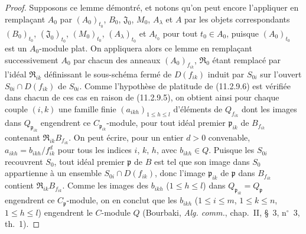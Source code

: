 \begin{proof}
Supposons ce lemme démontré, et notons qu'on peut encore l'appliquer en
remplaçant $A_0$ par $(A_0)_{t_0}$, $B_0$, $\mathfrak J_0$, $M_0$,
$A_\lambda$ et $A$ par les objets correspondants $(B_0)_{t_0}$,
$(\mathfrak J_0)_{t_0}$, $(M_0)_{t_0}$, $(A_\lambda)_{t_0}$ et $A_{t_0}$ pour
tout $t_0\in A_0$, puisque $(A_0)_{t_0}$ est un $A_0$-module plat. On
appliquera alors ce lemme en remplaçant successivement $A_0$ par chacun des
anneaux $(A_0)_{f_{ik}}$, $\mathfrak R_0$ étant remplacé par l'idéal
$\mathfrak R_{ik}$ définissant le sous-schéma fermé de $D(f_{ik})$ induit par
$S_{0i}$ sur l'ouvert $S_{0i}\cap D(f_{ik})$ de $S_{0i}$. Comme l'hypothèse
de platitude de (11.2.9.6) est vérifiée dans chacun de ces cas en raison de
(11.2.9.5), on obtient ainsi pour chaque couple $(i,k)$ une famille finie
$(a_{ikh})_{1\leq h\leq l}$ d'éléments de $Q_{f_{ik}}$ dont les images dans
$Q_{\mathfrak p_{ik}}$ engendrent ce $C_{\mathfrak p_{ik}}$-module, pour tout
idéal premier $\mathfrak p_{ik}$ de $B_{f_{ik}}$ contenant
$\mathfrak R_{ik}B_{f_{ik}}$. On peut écrire, pour un entier $d>0$ convenable,
$a_{ikh}=b_{ikh}/f_{ik}^d$ pour tous les indices $i$, $k$, $h$, avec
$b_{ikh}\in Q$. Puisque les $S_{0i}$ recouvrent $S_0$, tout idéal premier
$\mathfrak p$ de $B$ est tel que son image dans $S_0$ appartienne à un
ensemble $S_{0i}\cap D(f_{ik})$, donc l'image $\mathfrak p_{ik}$ de
$\mathfrak p$ dans $B_{f_{ik}}$ contient $\mathfrak R_{ik}B_{f_{ik}}$. Comme
les images des $b_{ikh}$ ($1\leq h\leq l$) dans
$Q_{\mathfrak p_{ik}}=Q_\mathfrak p$ engendrent ce $C_\mathfrak p$-module,
on en conclut que les $b_{ikh}$
($1\leq i\leq m$, $1\leq k\leq n$, $1\leq h\leq l$) engendrent le
$C$-module $Q$ (Bourbaki, \emph{Alg. comm.}, chap.~II, \S~3, n$^\circ$~3,
th.~1).


\end{proof}
